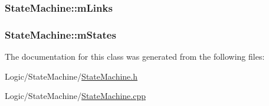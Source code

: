 \subsubsection[{\texorpdfstring{m\+Links}{mLinks}}]{ State\+Machine\+::m\+Links\hspace{0.3cm}{\ttfamily [private]}}\hypertarget{classStateMachine_a4161abc2a3b5c4f5301e67fb41de1933}{}\label{classStateMachine_a4161abc2a3b5c4f5301e67fb41de1933}
\subsubsection[{\texorpdfstring{m\+States}{mStates}}]{ State\+Machine\+::m\+States\hspace{0.3cm}{\ttfamily [private]}}\hypertarget{classStateMachine_a2fe1471be5c013a4522b1f5548752172}{}\label{classStateMachine_a2fe1471be5c013a4522b1f5548752172}


The documentation for this class was generated from the following files\+:\begin{DoxyCompactItemize}
\item 
Logic/\+State\+Machine/\hyperlink{StateMachine_8h}{State\+Machine.\+h}\item 
Logic/\+State\+Machine/\hyperlink{StateMachine_8cpp}{State\+Machine.\+cpp}\end{DoxyCompactItemize}
